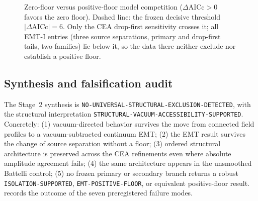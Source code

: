 \documentclass[11pt,a4paper]{article}
\theoremstyle{definition}
\theoremstyle{remark}
\begin{document}
\begin{figure}[t]
\centering
{}
\caption{Zero-floor versus positive-floor model competition ($\Delta\mathrm{AICc}>0$ favors the zero floor). Dashed line: the frozen decisive threshold $|\Delta\mathrm{AICc}|=6$. Only the CEA drop-first sensitivity crosses it; all EMT-I entries (three source separations, primary and drop-first tails, two families) lie below it, so the data there neither exclude nor establish a positive floor.}\label{fig:aicc}
\end{figure}

\subsection{Synthesis and falsification audit}\label{ssec:synth2}
The Stage~2 synthesis is \texttt{NO-\allowbreak{}UNIVERSAL-\allowbreak{}STRUCTURAL-\allowbreak{}EXCLUSION-\allowbreak{}DETECTED}, with the structural interpretation \texttt{STRUCTURAL-\allowbreak{}VACUUM-\allowbreak{}ACCESSIBILITY-\allowbreak{}SUPPORTED}. Concretely: (1) vacuum-directed behavior survives the move from connected field profiles to a vacuum-subtracted continuum EMT; (2) the EMT result survives the change of source separation without a floor; (3) ordered structural architecture is preserved across the CEA refinements even where absolute amplitude agreement fails; (4) the same architecture appears in the unsmoothed Battelli control; (5) no frozen primary or secondary branch returns a robust \texttt{ISOLATION-\allowbreak{}SUPPORTED}, \texttt{EMT-\allowbreak{}POSITIVE-\allowbreak{}FLOOR}, or equivalent positive-floor result.  records the outcome of the seven preregistered failure modes.
\end{document}
